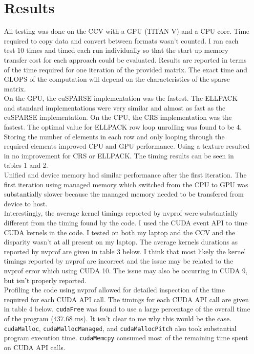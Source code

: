 \documentclass{article} \usepackage[utf8]{inputenc} \usepackage{amsmath}
\begin{document}
\section{Results}

All testing was done on the CCV with a GPU (TITAN V) and a CPU core.  Time
required to copy data and convert between formats wasn't counted. I ran each
test 10 times and timed each run individually so that the start up memory
transfer cost for each approach could be evaluated.  Results are reported in
terms of the time required for one iteration of the provided matrix.  The exact
time and GLOPS of the computation will depend on the characteristics of the
sparse matrix. \\

On the GPU, the cuSPARSE implementation was the fastest.  The ELLPACK and
standard implementations were very similar and almost as fast as the cuSPARSE
implementation. On the CPU, the CRS implementation was the fastest. The optimal
value for ELLPACK row loop unrolling was found to be 4.  Storing the number of
elements in each row and only looping through the required elements improved
CPU and GPU performance.  Using a texture resulted in no improvement for CRS or
ELLPACK.  The timing results can be seen in tables 1 and 2. \\

Unified and device memory had similar performance after the first iteration.
The first iteration using managed memory which switched from the CPU to GPU was
substantially slower because the managed memory needed to be transfered from
device to host. \\

Interestingly, the average kernel timings reported by nvprof were substantially
different from the timing found by the code. I used the CUDA event API to time
CUDA kernels in the code. I tested on both my laptop and the CCV and the
disparity wasn't at all present on my laptop. The average kernels durations as
reported by nvprof are given in table 3 below. I think that most likely the
kernel timings reported by nvprof are incorrect and the issue may be related to
the nvprof error which using CUDA 10. The issue may also be occurring in CUDA
9, but isn't properly reported.  \\ 

Profiling the code using nvprof allowed for detailed inspection of the time
required for each CUDA API call. The timings for each CUDA API call are given
in table 4 below. \texttt{cudaFree} was found to use a large percentage of the
overall time of the program (437.68 ms). It isn't clear to me why this would be
the case. \texttt{cudaMalloc}, \texttt{cudaMallocManaged}, and
\texttt{cudaMallocPitch} also took substantial program execution time.
\texttt{cudaMemcpy} consumed most of the remaining time spent on CUDA API
calls. \\
\end{document}
